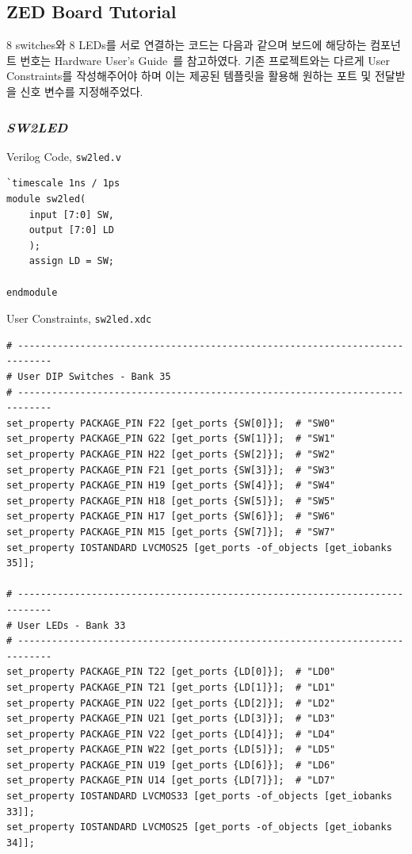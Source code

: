 \documentclass{article}
\begin{document}
\subsection{ZED Board Tutorial}
8 switches와 8 LEDs를 서로 연결하는 코드는 다음과 같으며 보드에 해당하는 컴포넌트 번호는 Hardware User's Guide~\cite{UG}를 참고하였다. 기존 프로젝트와는 다르게 User Constraints를 작성해주어야 하며 이는 제공된 템플릿을 활용해 원하는 포트 및 전달받을 신호 변수를 지정해주었다.

\subsubsection*{\textit{SW2LED}}

\begin{itemize*}
\item Verilog Code, \texttt{sw2led.v}
\begin{lstlisting}[style={verilog-style}]
`timescale 1ns / 1ps
module sw2led(
    input [7:0] SW,
    output [7:0] LD
    );
    assign LD = SW;
    
endmodule
\end{lstlisting}

\item User Constraints, \texttt{sw2led.xdc}
\begin{lstlisting}[style={verilog-style}]
# ----------------------------------------------------------------------------
# User DIP Switches - Bank 35
# ---------------------------------------------------------------------------- 
set_property PACKAGE_PIN F22 [get_ports {SW[0]}];  # "SW0"
set_property PACKAGE_PIN G22 [get_ports {SW[1]}];  # "SW1"
set_property PACKAGE_PIN H22 [get_ports {SW[2]}];  # "SW2"
set_property PACKAGE_PIN F21 [get_ports {SW[3]}];  # "SW3"
set_property PACKAGE_PIN H19 [get_ports {SW[4]}];  # "SW4"
set_property PACKAGE_PIN H18 [get_ports {SW[5]}];  # "SW5"
set_property PACKAGE_PIN H17 [get_ports {SW[6]}];  # "SW6"
set_property PACKAGE_PIN M15 [get_ports {SW[7]}];  # "SW7"
set_property IOSTANDARD LVCMOS25 [get_ports -of_objects [get_iobanks 35]];

# ----------------------------------------------------------------------------
# User LEDs - Bank 33
# ---------------------------------------------------------------------------- 
set_property PACKAGE_PIN T22 [get_ports {LD[0]}];  # "LD0"
set_property PACKAGE_PIN T21 [get_ports {LD[1]}];  # "LD1"
set_property PACKAGE_PIN U22 [get_ports {LD[2]}];  # "LD2"
set_property PACKAGE_PIN U21 [get_ports {LD[3]}];  # "LD3"
set_property PACKAGE_PIN V22 [get_ports {LD[4]}];  # "LD4"
set_property PACKAGE_PIN W22 [get_ports {LD[5]}];  # "LD5"
set_property PACKAGE_PIN U19 [get_ports {LD[6]}];  # "LD6"
set_property PACKAGE_PIN U14 [get_ports {LD[7]}];  # "LD7"
set_property IOSTANDARD LVCMOS33 [get_ports -of_objects [get_iobanks 33]];
set_property IOSTANDARD LVCMOS25 [get_ports -of_objects [get_iobanks 34]];
\end{lstlisting}
\end{itemize*}
\end{document}
